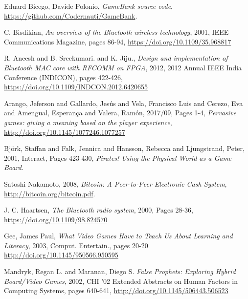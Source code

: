 %
%
%
\begin{thebibliography}{1}
  
  Eduard Bicego, Davide Polonio,
  \emph{GameBank source code},
  \url{https://github.com/Codernauti/GameBank}.
  
  C. Bisdikian,
  \emph{An overview of the Bluetooth wireless technology},
  2001,
  IEEE Communications Magazine, pages 86-94,
  \url{https://doi.org/10.1109/35.968817}

  R. Aneesh and B. Sreekumari. and K. Jiju.,
  \emph{Design and implementation of Bluetooth MAC core with RFCOMM on FPGA},
  2012,
  2012 Annual IEEE India Conference (INDICON), pages 422-426,
  \url{https://doi.org/10.1109/INDCON.2012.6420655}

  Arango, Jeferson and Gallardo, Jesús and Vela, Francisco Luis and Cerezo, Eva 
and Amengual, Esperança and Valera, Ramón,
  2017/09,
  Pages 1-4,
  \emph{Pervasive games: giving a meaning based on the player experience},
  \url{http://doi.org/10.1145/1077246.1077257}
  
  Bj{\"o}rk, Staffan and Falk, Jennica and Hansson, Rebecca and Ljungstrand, 
Peter,
  2001,
  Interact, Pages 423-430,
  \emph{Pirates! Using the Physical World as a Game Board.}
  
  Satoshi Nakamoto,
  2008,
  \emph{Bitcoin: A Peer-to-Peer Electronic Cash System},
  \url{http://bitcoin.org/bitcoin.pdf}.
  
  J. C. Haartsen,
  \emph{The Bluetooth radio system},
  2000,
  Pages 28-36,
  \url{https://doi.org/10.1109/98.824570}

  Gee, James Paul,
  \emph{What Video Games Have to Teach Us About Learning and Literacy},
  2003,
  Comput. Entertain., pages 20-20
  \url{http://doi.org/10.1145/950566.950595}
  
  Mandryk, Regan L. and Maranan, Diego S.
  \emph{False Prophets: Exploring Hybrid Board/Video Games},
  2002,
  CHI '02 Extended Abstracts on Human Factors in Computing Systems, pages 
640-641,
  \url{http://doi.org/10.1145/506443.506523}
  
\end{thebibliography}